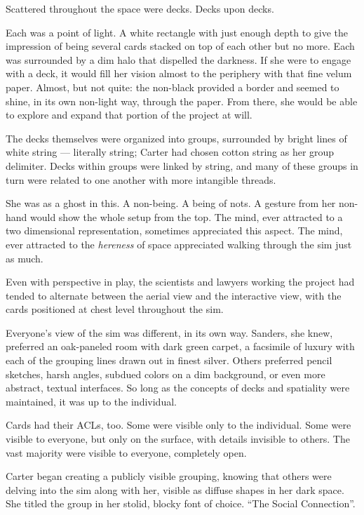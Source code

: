 Scattered throughout the space were decks. Decks upon decks.

Each was a point of light. A white rectangle with just enough depth to give the impression of being several cards stacked on top of each other but no more. Each was surrounded by a dim halo that dispelled the darkness. If she were to engage with a deck, it would fill her vision almost to the periphery with that fine velum paper. Almost, but not quite: the non-black provided a border and seemed to shine, in its own non-light way, through the paper. From there, she would be able to explore and expand that portion of the project at will.

The decks themselves were organized into groups, surrounded by bright lines of white string --- literally string; Carter had chosen cotton string as her group delimiter. Decks within groups were linked by string, and many of these groups in turn were related to one another with more intangible threads.

She was as a ghost in this. A non-being. A being of nots. A gesture from her non-hand would show the whole setup from the top. The mind, ever attracted to a two dimensional representation, sometimes appreciated this aspect. The mind, ever attracted to the \emph{hereness} of space appreciated walking through the sim just as much.

Even with perspective in play, the scientists and lawyers working the project had tended to alternate between the aerial view and the interactive view, with the cards positioned at chest level throughout the sim.

Everyone's view of the sim was different, in its own way. Sanders, she knew, preferred an oak-paneled room with dark green carpet, a facsimile of luxury with each of the grouping lines drawn out in finest silver. Others preferred pencil sketches, harsh angles, subdued colors on a dim background, or even more abstract, textual interfaces. So long as the concepts of decks and spatiality were maintained, it was up to the individual.

Cards had their ACLs, too. Some were visible only to the individual. Some were visible to everyone, but only on the surface, with details invisible to others. The vast majority were visible to everyone, completely open.

Carter began creating a publicly visible grouping, knowing that others were delving into the sim along with her, visible as diffuse shapes in her dark space. She titled the group in her stolid, blocky font of choice. ``The Social Connection''.


